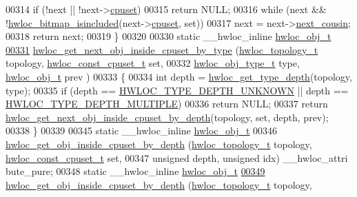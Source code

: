 \begin{DoxyCode}
00314   \textcolor{keywordflow}{if} (!next || !next->\hyperlink{a00016_a67925e0f2c47f50408fbdb9bddd0790f}{cpuset})
00315     \textcolor{keywordflow}{return} NULL;
00316   \textcolor{keywordflow}{while} (next && !\hyperlink{a00065_gaae29e14a926c198e8f91e6e4790621e7}{hwloc_bitmap_isincluded}(next->\hyperlink{a00016_a67925e0f2c47f50408fbdb9bddd0790f}{cpuset}, \textcolor{keyword}{set}))
00317     next = next->\hyperlink{a00016_a85a788017457129589318b6c39451acf}{next_cousin};
00318   \textcolor{keywordflow}{return} next;
00319 \}
00320 
00330 \textcolor{keyword}{static} \_\_hwloc\_inline \hyperlink{a00016}{hwloc_obj_t}
\hypertarget{a00031_source_l00331}{}\hyperlink{a00054_ga934e7ecd68b33403e0c0be779d9ed1e6}{00331} \hyperlink{a00054_ga934e7ecd68b33403e0c0be779d9ed1e6}{hwloc_get_next_obj_inside_cpuset_by_type} (\hyperlink{a00039_ga9d1e76ee15a7dee158b786c30b6a6e38}{hwloc_topology_t} topology, 
      \hyperlink{a00040_ga1f784433e9b606261f62d1134f6a3b25}{hwloc_const_cpuset_t} \textcolor{keyword}{set},
00332                                           \hyperlink{a00041_gacd37bb612667dc437d66bfb175a8dc55}{hwloc_obj_type_t} type, \hyperlink{a00016}{hwloc_obj_t} prev
      )
00333 \{
00334   \textcolor{keywordtype}{int} depth = \hyperlink{a00046_gaea7c64dd59467f5201ba87712710b14d}{hwloc_get_type_depth}(topology, type);
00335   \textcolor{keywordflow}{if} (depth == \hyperlink{a00046_ggaf4e663cf42bbe20756b849c6293ef575a0565ab92ab72cb0cec91e23003294aad}{HWLOC_TYPE_DEPTH_UNKNOWN} || depth == \hyperlink{a00046_ggaf4e663cf42bbe20756b849c6293ef575ae99465995cacde6c210d5fc2e409798c}{HWLOC_TYPE_DEPTH_MULTIPLE})
00336     \textcolor{keywordflow}{return} NULL;
00337   \textcolor{keywordflow}{return} \hyperlink{a00054_ga8af256c2572f16520f95440b884c1bd6}{hwloc_get_next_obj_inside_cpuset_by_depth}(topology, \textcolor{keyword}{set}, depth, prev);
00338 \}
00339 
00345 \textcolor{keyword}{static} \_\_hwloc\_inline \hyperlink{a00016}{hwloc_obj_t}
00346 \hyperlink{a00054_ga57c8a0e227d1b16a31d19aaf755b42c0}{hwloc_get_obj_inside_cpuset_by_depth} (\hyperlink{a00039_ga9d1e76ee15a7dee158b786c30b6a6e38}{hwloc_topology_t} topology, 
      \hyperlink{a00040_ga1f784433e9b606261f62d1134f6a3b25}{hwloc_const_cpuset_t} \textcolor{keyword}{set},
00347                                       \textcolor{keywordtype}{unsigned} depth, \textcolor{keywordtype}{unsigned} idx) \_\_hwloc\_attri
      bute\_pure;
00348 \textcolor{keyword}{static} \_\_hwloc\_inline \hyperlink{a00016}{hwloc_obj_t}
\hypertarget{a00031_source_l00349}{}\hyperlink{a00054_ga57c8a0e227d1b16a31d19aaf755b42c0}{00349} \hyperlink{a00054_ga57c8a0e227d1b16a31d19aaf755b42c0}{hwloc_get_obj_inside_cpuset_by_depth} (\hyperlink{a00039_ga9d1e76ee15a7dee158b786c30b6a6e38}{hwloc_topology_t} topology, 

\end{DoxyCode}
